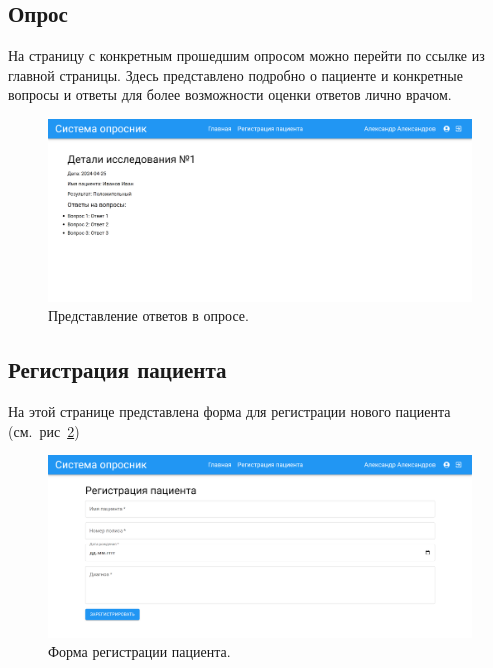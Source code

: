 \subsection{Опрос}\label{subsec:2}
На страницу с конкретным прошедшим опросом можно перейти по ссылке из главной страницы.
Здесь представлено подробно о пациенте и конкретные вопросы и ответы для более возможности оценки ответов лично врачом.
\begin{figure}[ht]
    \includegraphics[scale=0.17]{images/screenshots/inquirer}
    \caption{Представление ответов в опросе.}\label{fig:figure6}
\end{figure}

\newpage
\subsection{Регистрация пациента}\label{subsec:-3}
На этой странице представлена форма для регистрации нового пациента (см.\ рис~\ref{fig:figure7})
\begin{figure}[ht]
    \includegraphics[scale=0.17]{images/screenshots/registration}
    \caption{Форма регистрации пациента.}\label{fig:figure7}
\end{figure}